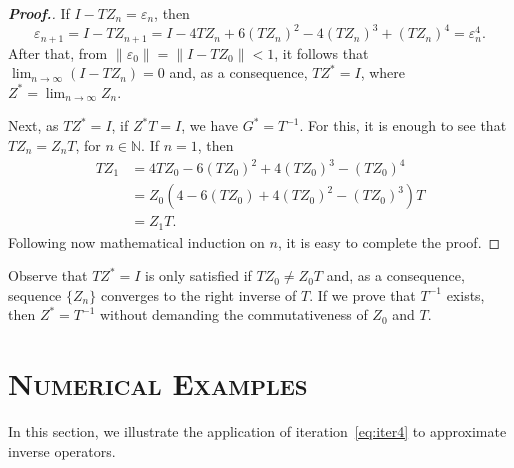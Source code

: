 \documentclass[11pt,twoside,letterpaper]{article} %
\begin{document}
\begin{proof}[\normalfont\textbf{Proof.}]
If $I-TZ_n=\varepsilon_n$, then
$$
\varepsilon_{n+1} = I-TZ_{n+1}
= I-4TZ_n + 6(TZ_n)^{2} - 4(TZ_n)^{3} + (TZ_n)^{4}
= \varepsilon_{n}^{4}.
$$
After that, from $\|\varepsilon_0\|=\|I-TZ_0\|<1$, it follows that
$\lim_{n\rightarrow\infty}(I-TZ_n)=0$ and, as a consequence, $TZ^{\ast}=I$, where $Z^{\ast}=\lim_{n\rightarrow\infty}Z_n$.

Next, as $TZ^{\ast}=I$, if $Z^{\ast}T=I$, we have $G^{\ast}=T^{-1}$.
For this, it is enough to see that $TZ_n=Z_nT$, for $n\in\mathbb{N}$.
If $n=1$, then
\begin{align*}
TZ_{1} &= 4TZ_0-6(TZ_0)^{2}+4(TZ_0)^{3}-(TZ_0)^{4} \\
&= Z_0\left(4-6(TZ_{0})+4(TZ_0)^{2}-(TZ_0)^{3}\right)T \\
&= Z_1T.
\end{align*}
Following now mathematical induction on $n$, it is easy to complete the proof.
\end{proof}

Observe that $TZ^{\ast}=I$ is only satisfied if $TZ_0\neq Z_0T$ and, as a consequence, sequence $\{Z_n\}$ converges to the right inverse of $T$. If we prove that $T^{-1}$ exists, then $Z^{\ast}=T^{-1}$ without demanding the commutativeness of $Z_{0}$ and $T$.

\section{\scshape Numerical Examples}

In this section, we illustrate the application of iteration~\eqref{eq:iter4} to approximate inverse operators.
\end{document}

